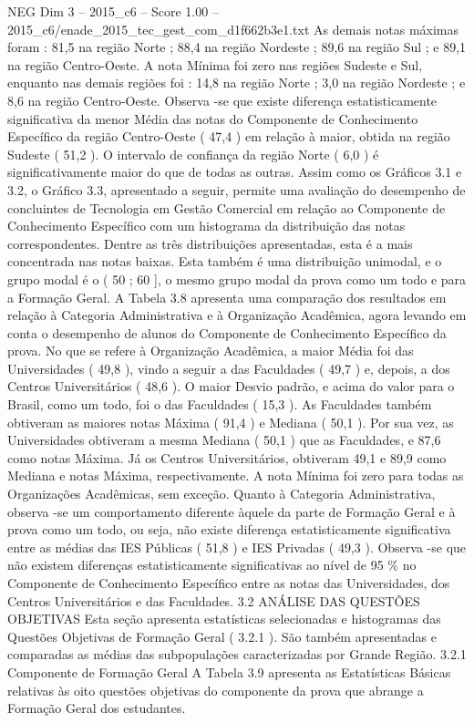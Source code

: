 \begin{textsample}{NEG Dim 3 – 2015\_c6 – Score 1.00 – 2015\_c6/enade\_2015\_tec\_gest\_com\_d1f662b3e1.txt}
As demais notas máximas foram : 81,5 na região Norte ; 88,4 na região Nordeste ; 89,6 na região Sul ; e 89,1 na região Centro-Oeste.
A nota Mínima foi zero nas regiões Sudeste e Sul, enquanto nas demais regiões foi : 14,8 na região Norte ; 3,0 na região Nordeste ; e 8,6 na região Centro-Oeste.
Observa -se que existe diferença estatisticamente significativa da menor Média das notas do Componente de Conhecimento Específico da região Centro-Oeste ( 47,4 ) em relação à maior, obtida na região Sudeste ( 51,2 ).
O intervalo de confiança da região Norte ( 6,0 ) é significativamente maior do que de todas as outras.
Assim como os Gráficos 3.1 e 3.2, o Gráfico 3.3, apresentado a seguir, permite uma avaliação do desempenho de concluintes de Tecnologia em Gestão Comercial em relação ao Componente de Conhecimento Específico com um histograma da distribuição das notas correspondentes.
Dentre as três distribuições apresentadas, esta é a mais concentrada nas notas baixas.
Esta também é uma distribuição unimodal, e o grupo modal é o ( 50 ; 60 ], o mesmo grupo modal da prova como um todo e para a Formação Geral.
A Tabela 3.8 apresenta uma comparação dos resultados em relação à Categoria Administrativa e à Organização Acadêmica, agora levando em conta o desempenho de alunos do Componente de Conhecimento Específico da prova.
No que se refere à Organização Acadêmica, a maior Média foi das Universidades ( 49,8 ), vindo a seguir a das Faculdades ( 49,7 ) e, depois, a dos Centros Universitários ( 48,6 ).
O maior Desvio padrão, e acima do valor para o Brasil, como um todo, foi o das Faculdades ( 15,3 ).
As Faculdades também obtiveram as maiores notas Máxima ( 91,4 ) e Mediana ( 50,1 ).
Por sua vez, as Universidades obtiveram a mesma Mediana ( 50,1 ) que as Faculdades, e 87,6 como notas Máxima.
Já os Centros Universitários, obtiveram 49,1 e 89,9 como Mediana e notas Máxima, respectivamente.
A nota Mínima foi zero para todas as Organizações Acadêmicas, sem exceção.
Quanto à Categoria Administrativa, observa -se um comportamento diferente àquele da parte de Formação Geral e à prova como um todo, ou seja, não existe diferença estatisticamente significativa entre as médias das IES Públicas ( 51,8 ) e IES Privadas ( 49,3 ).
Observa -se que não existem diferenças estatisticamente significativas ao nível de 95 \% no Componente de Conhecimento Específico entre as notas das Universidades, dos Centros Universitários e das Faculdades. 3.2 ANÁLISE DAS QUESTÕES OBJETIVAS Esta seção apresenta estatísticas selecionadas e histogramas das Questões Objetivas de Formação Geral ( 3.2.1 ).
São também apresentadas e comparadas as médias das subpopulações caracterizadas por Grande Região. 3.2.1 Componente de Formação Geral A Tabela 3.9 apresenta as Estatísticas Básicas relativas às oito questões objetivas do componente da prova que abrange a Formação Geral dos estudantes.

\end{textsample}

